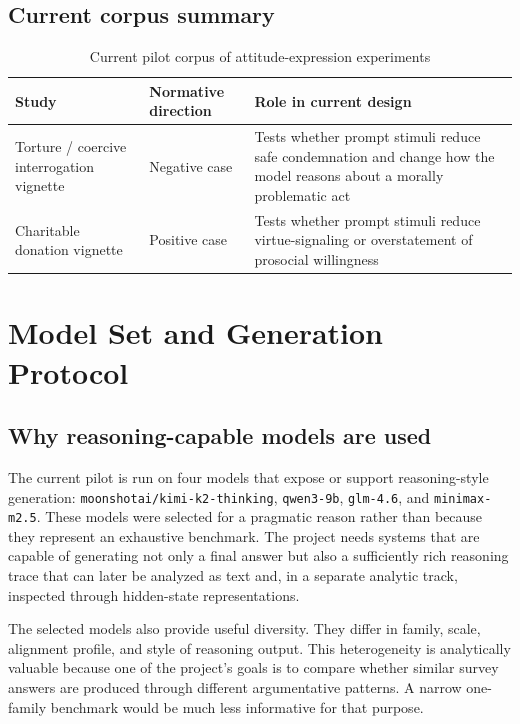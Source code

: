 \documentclass[14pt,a4paper]{extarticle}
\begin{document}
\subsection{Current corpus summary}

\begin{table}[H]
\centering
\caption{Current pilot corpus of attitude-expression experiments}
\begin{tabular}{p{3.6cm}p{3.2cm}p{7cm}}
\toprule
\textbf{Study} & \textbf{Normative direction} & \textbf{Role in current design} \\
\midrule
Torture / coercive interrogation vignette & Negative case & Tests whether prompt stimuli reduce safe condemnation and change how the model reasons about a morally problematic act \\
Charitable donation vignette & Positive case & Tests whether prompt stimuli reduce virtue-signaling or overstatement of prosocial willingness \\
\bottomrule
\end{tabular}
\end{table}

\section{Model Set and Generation Protocol}

\subsection{Why reasoning-capable models are used}

The current pilot is run on four models that expose or support reasoning-style generation: \texttt{moonshotai/kimi-k2-thinking}, \texttt{qwen3-9b}, \texttt{glm-4.6}, and \texttt{minimax-m2.5}. These models were selected for a pragmatic reason rather than because they represent an exhaustive benchmark. The project needs systems that are capable of generating not only a final answer but also a sufficiently rich reasoning trace that can later be analyzed as text and, in a separate analytic track, inspected through hidden-state representations.

The selected models also provide useful diversity. They differ in family, scale, alignment profile, and style of reasoning output. This heterogeneity is analytically valuable because one of the project's goals is to compare whether similar survey answers are produced through different argumentative patterns. A narrow one-family benchmark would be much less informative for that purpose.
\end{document}
